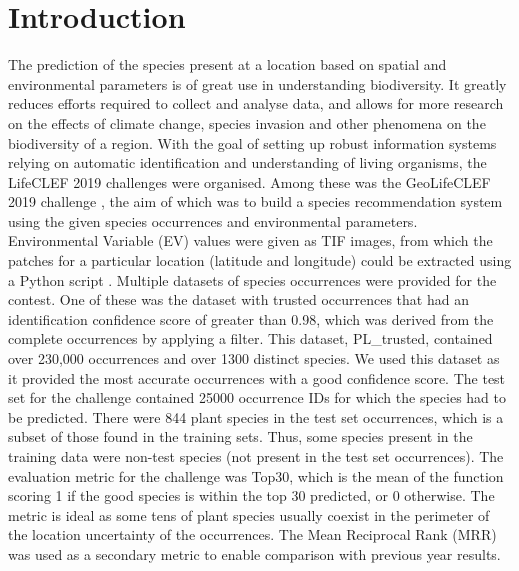 \documentclass[runningheads]{llncs}
\begin{document}
\section{Introduction}
The prediction of the species present at a location based on spatial and environmental parameters is of great use in understanding biodiversity. It greatly reduces efforts required to collect and analyse data, and allows for more research on the effects of climate change, species invasion and other phenomena on the biodiversity of a region.
\newline 
\newline 
\noindent With the goal of setting up robust information systems relying on automatic identification and understanding of living organisms, the LifeCLEF 2019 challenges \cite{lifeclef2019} were organised. Among these was the GeoLifeCLEF 2019 challenge \cite{geolifeclef2019}, the aim of which was to build a species recommendation system using the given species occurrences and environmental parameters. Environmental Variable (EV) values were given as TIF images, from which the patches for a particular location (latitude and longitude) could be extracted using a Python script \cite{maxgit}. 
\newline
\newline
\noindent Multiple datasets of species occurrences were provided for the contest. One of these was the dataset with trusted occurrences that had an identification confidence score of greater than 0.98, which was derived from the complete occurrences by applying a filter. This dataset, PL\_trusted, contained over 230,000 occurrences and over 1300 distinct species. We used this dataset as it provided the most accurate occurrences with a good confidence score.
\newline
\newline
\noindent The test set for the challenge contained 25000 occurrence IDs for which the species had to be predicted. There were 844 plant species in the test set occurrences, which is a subset of those found in the training sets. Thus, some species present in the training data were non-test species (not present in the test set occurrences).
\newline
\newline
\noindent The evaluation metric for the challenge was Top30, which is the mean of the function scoring 1 if the good species is within the top 30 predicted, or 0 otherwise. The metric is ideal as some tens of plant species usually coexist in the perimeter of the location uncertainty of the occurrences. The Mean Reciprocal Rank (MRR) was used as a secondary metric to enable comparison with previous year results.
\end{document}
